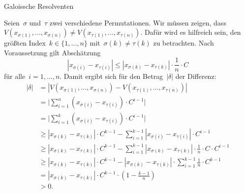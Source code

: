 \documentclass{algblatt}
\begin{document}
\begin{aufgabe}{Galoissche Resolventen}
\begin{loesungE}
\item Seien~$\sigma$ und~$\tau$ zwei verschiedene Permutationen. Wir müssen
zeigen, dass~$V(x_{\sigma(1)},\ldots,x_{\sigma(n)}) \neq
V(x_{\tau(1)},\ldots,x_{\tau(n)})$. Dafür wird es hilfreich sein, den größten
Index~$k \in \{ 1,\ldots,n \}$ mit~$\sigma(k) \neq \tau(k)$ zu betrachten. Nach
Voraussetzung gilt Abschätzung
\[ |x_{\sigma(i)} - x_{\tau(i)}| \leq
  |x_{\sigma(k)} - x_{\tau(k)}| \cdot
  \frac{1}{n} \cdot C \]
für alle~$i = 1,\ldots,n$. Damit ergibt sich für den Betrag~$|\delta|$ der
Differenz:
\begin{align*}
  |\delta| &= |V(x_{\sigma(1)},\ldots,x_{\sigma(n)}) -
  V(x_{\tau(1)},\ldots,x_{\tau(n)})| \\
  &=
  \Biggl|\sum_{i=1}^n (x_{\sigma(i)} - x_{\tau(i)}) \cdot C^{i-1}\Biggr| \\
  &= \Biggl|\sum_{i=1}^k (x_{\sigma(i)} - x_{\tau(i)}) \cdot C^{i-1}\Biggr| \\
  &\geq |x_{\sigma(k)} - x_{\tau(k)}| \cdot C^{k-1} - \sum_{i=1}^{k-1}
  |x_{\sigma(i)} - x_{\tau(i)}| \cdot C^{i-1}\\
  &\geq |x_{\sigma(k)} - x_{\tau(k)}| \cdot C^{k-1} - \sum_{i=1}^{k-1}
  |x_{\sigma(k)} - x_{\tau(k)}| \cdot \frac{1}{n} \cdot C \cdot C^{i-1} \\
  &\geq |x_{\sigma(k)} - x_{\tau(k)}| \cdot C^{k-1} - |x_{\sigma(k)} -
  x_{\tau(k)}| \cdot \sum_{i=1}^{k-1}
  \frac{1}{n} \cdot C^{k-1} \\
  &= |x_{\sigma(k)} - x_{\tau(k)}| \cdot C^{k-1} \cdot \left(1 -
  \frac{k-1}{n}\right) \\
  &> 0.
\end{align*}
\end{loesungE}
\end{aufgabe}
\end{document}
